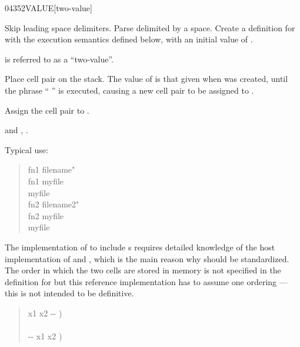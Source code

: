 
\begin{worddef}{0435}{2VALUE}[two-value]
\item {}

	Skip leading space delimiters.  Parse  delimited by a
	space.  Create a definition for  with the execution
	semantics defined below, with an initial value of .

	 is referred to as a ``two-value''.

\execute[name]

	Place cell pair  on the stack.  The value of
	 is that given when  was created,
	until the phrase ``  '' is
	executed, causing a new cell pair  to be assigned
	to .


	Assign the cell pair  to .

\see {} and ,
	.

	\begin{rationale}
		Typical use:
		\begin{quote}\ttfamily
			\word{:} fn1  filename" \word{;} \\
			fn1  myfile \\
			myfile  \\[2ex]
			\word{:} fn2  filename2" \word{;} \\
			fn2  myfile \\
			myfile 
		\end{quote}
	\end{rationale}

	\begin{implement}
		\dffamily
		The implementation of  to include s
		requires detailed knowledge of the host implementation of
		 and , which is the main reason why
		 should be standardized.  The order in which
		the two cells are stored in memory is not specified in the
		definition for  but this reference implementation
		has to assume one ordering --- this is not intended to be
		definitive.

		\begin{quote}\ttfamily
			\word{:}   x1 x2 -{}- ) \\
			\tab {} \word{,} \word{,} \\
			\tab {}   -{}- x1 x2 ) \\
			\word{;}
		\end{quote}


\end{implement}
\end{worddef}
